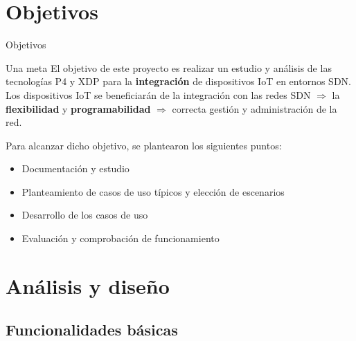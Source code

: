 \documentclass[10pt,compress,xcolor=table]{beamer} %
\begin{document}
\section{Objetivos}
\begin{frame}{Objetivos}

\begin{exampleblock}{Una meta}
El objetivo de este proyecto es realizar un estudio y análisis de las tecnologías P4 y XDP para la \alert{\textbf{integración}} de dispositivos IoT en entornos SDN. \\
\vspace{0.2cm}
Los dispositivos IoT se beneficiarán de la integración con las redes SDN $ \Rightarrow $  la \textbf{flexibilidad} y \textbf{programabilidad} $ \Rightarrow $  correcta gestión y administración de la red.
\end{exampleblock}
\vspace{0.3cm}
Para alcanzar dicho objetivo, se plantearon los siguientes puntos:
\vspace{0.1cm}
\begin{itemize}
    \item Documentación y estudio
    \item Planteamiento de casos de uso típicos y elección de escenarios
    \item Desarrollo de los casos de uso
    \item Evaluación y comprobación de funcionamiento
\end{itemize}

\end{frame}

\section{Análisis y diseño}
\subsection{Funcionalidades básicas}
\end{document}
